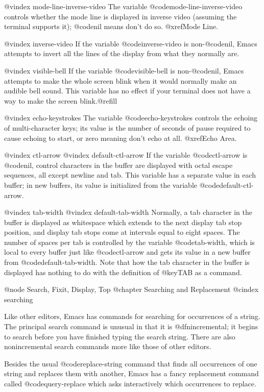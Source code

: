 {{{{{{{@vindex mode-line-inverse-video
  The variable @code{mode-line-inverse-video} controls whether the mode
line is displayed in inverse video (assuming the terminal supports it);
@code{nil} means don't do so.  @xref{Mode Line}.

@vindex inverse-video
  If the variable @code{inverse-video} is non-@code{nil}, Emacs attempts
to invert all the lines of the display from what they normally are.

@vindex visible-bell
If the variable @code{visible-bell} is non-@code{nil}, Emacs attempts
to make the whole screen blink when it would normally make an audible bell
sound.  This variable has no effect if your terminal does not have a way
to make the screen blink.@refill

@vindex echo-keystrokes
The variable @code{echo-keystrokes} controls the echoing of multi-character
keys; its value is the number of seconds of pause required to cause echoing
to start, or zero meaning don't echo at all.  @xref{Echo Area}.

@vindex ctl-arrow
@vindex default-ctl-arrow
If the variable @code{ctl-arrow} is @code{nil}, control characters in the buffer
are displayed with octal escape sequences, all except newline and tab.
This variable has a separate value in each buffer; in new buffers, its
value is initialized from the variable @code{default-ctl-arrow}.

@vindex tab-width
@vindex default-tab-width
  Normally, a tab character in the buffer is displayed as whitespace which
extends to the next display tab stop position, and display tab stops come
at intervals equal to eight spaces.  The number of spaces per tab is
controlled by the variable @code{tab-width}, which is local to every
buffer just like @code{ctl-arrow} and gets its value in a new buffer from
@code{default-tab-width}.  Note that how the tab character in the buffer is
displayed has nothing to do with the definition of @key{TAB} as a command.

@node Search, Fixit, Display, Top
@chapter Searching and Replacement
@cindex searching

  Like other editors, Emacs has commands for searching for occurrences of
a string.  The principal search command is unusual in that it is
@dfn{incremental}; it begins to search before you have finished typing the
search string.  There are also nonincremental search commands more like
those of other editors.

  Besides the usual @code{replace-string} command that finds all
occurrences of one string and replaces them with another, Emacs has a fancy
replacement command called @code{query-replace} which asks interactively
which occurrences to replace.

}}}}}}}
